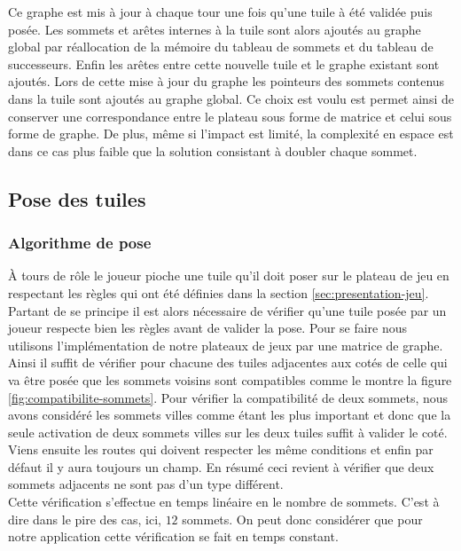 \documentclass[a4paper, 11pt]{article}
\begin{document}
			Ce graphe est mis à jour à chaque tour une fois qu'une tuile à été validée puis posée. Les sommets et arêtes internes à la tuile sont alors ajoutés au graphe global par réallocation de la mémoire du tableau de sommets et du tableau de successeurs. Enfin les arêtes entre cette nouvelle tuile et le graphe existant sont ajoutés. Lors de cette mise à jour du graphe les pointeurs des sommets contenus dans la tuile sont ajoutés au graphe global. Ce choix est voulu est permet ainsi de conserver une correspondance entre le plateau sous forme de matrice et celui sous forme de graphe. De plus, même si l'impact est limité, la complexité en espace est dans ce cas plus faible que la solution consistant à doubler chaque sommet. 


	\subsection{Pose des tuiles}\label{sec:pose-tuile}
		\subsubsection{Algorithme de pose}\label{sec:pose-tuile-algo}
			\indent À tours de rôle le joueur pioche une tuile qu'il doit poser sur le plateau de jeu en respectant les règles qui ont été définies dans la section \ref{sec:presentation-jeu}. Partant de se principe il est alors nécessaire de vérifier qu'une tuile posée par un joueur respecte bien les règles avant de valider la pose. Pour se faire nous utilisons l'implémentation de notre plateaux de jeux par une matrice de graphe. Ainsi il suffit de vérifier pour chacune des tuiles adjacentes aux cotés de celle qui va être posée que les sommets voisins sont compatibles comme le montre la figure \ref{fig:compatibilite-sommets}. Pour vérifier la compatibilité de deux sommets, nous avons considéré les sommets villes comme étant les plus important et donc que la seule activation de deux sommets villes sur les deux tuiles suffit à valider le coté. Viens ensuite les routes qui doivent respecter les même conditions et enfin par défaut il y aura toujours un champ. En résumé ceci revient à vérifier que deux sommets adjacents ne sont pas d'un type différent.  \\
			\indent Cette vérification s'effectue en temps linéaire en le nombre de sommets. C'est à dire dans le pire des cas, ici, $12$ sommets. On peut donc considérer que pour notre application cette vérification se fait en temps constant.
\end{document}
